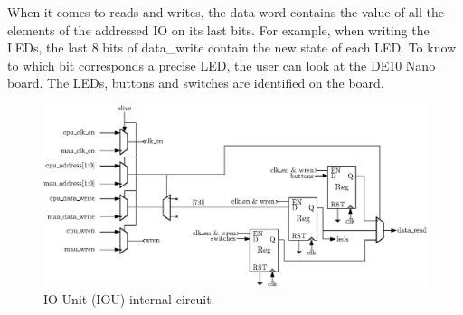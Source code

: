 When it comes to reads and writes, the data word contains the value of all the elements of the addressed 
IO on its last bits. For example, when writing the LEDs, the last 8 bits of data\_write contain the 
new state of each LED. To know to which bit corresponds a precise LED, the user can look at the
DE10 Nano board. The LEDs, buttons and switches are identified on the board.

\begin{figure}[H]
    \centering
    \includegraphics[width=\linewidth]{Chapter3-CPU/res/iou_in}
    \caption{IO Unit (IOU) internal circuit.}
    \label{fig:iou/iou_in}
\end{figure}
